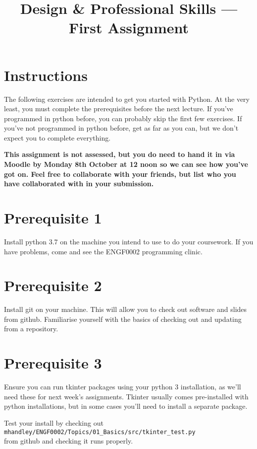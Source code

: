 \documentclass{article}
\title{Design \& Professional Skills --- First Assignment}
\author{}
\date{}
\begin{document}
\maketitle

\section*{Instructions}

The following exercises are intended to get you started with Python.
At the very least, you must complete the prerequisites before the next
lecture.  If you've programmed in python before, you can probably skip
the first few exercises.  If you've not programmed in python before,
get as far as you can, but we don't expect you to complete everything.

\textbf{This assignment is not assessed, but you do need to hand it in
  via Moodle by Monday 8th October at 12 noon so we can see how you've
  got on.  Feel free to collaborate with your friends, but list who
  you have collaborated with in your submission.}

\section*{Prerequisite 1}

Install python 3.7 on the machine you intend to use to do your
coursework.  If you have problems, come and see the ENGF0002
programming clinic.

\section*{Prerequisite 2}

Install git on your machine.  This will allow you to check out
software and slides from github.  Familiarise yourself with the basics
of checking out and updating from a repository.

\section*{Prerequisite 3}

Ensure you can run tkinter packages using your python 3 installation,
as we'll need these for next week's assignments.  Tkinter usually
comes pre-installed with python installations, but in some cases you'll need to
install a separate package.

\vspace{0.1in}\noindent Test your install by checking out\\
\texttt{mhandley/ENGF0002/Topics/01\_Basics/src/tkinter\_test.py}\\
from github and checking it runs properly.
\end{document}
